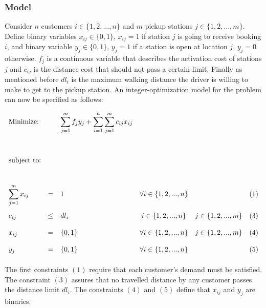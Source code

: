 \documentclass{article}
\begin{document}
\subsubsection{Model}
\label{subsection:model_partI}

Consider $n$ customers $i \in \{1,2,...,n\}$ and $m$ pickup stations $ j \in \{1,2,…,m\}$. Define binary variables $x_{ij} \in \{0, 1\}$,  $x_{ij} = 1$ if station $j$ is going to receive booking $i$, 
and binary variable $y_{j} \in \{0,1\}$, $y_{j}= 1$ if a station is open at location $j$, $y_{j}=0$ otherwise. $f_j$ is a continuous variable that describes the activation cost of stations $j$ and $c_{ij}$ is the distance cost that should not pass a certain limit.
Finally as mentioned before $dl_i$ is the maximum walking distance the driver is willing to make to get to the pickup station.
 An integer-optimization model for the problem can now be specified as follows:


\begin{equation*}
\def\arraystretch{2}
\begin{array}{lllcll} %
\text{Minimize:}  && \displaystyle\sum\limits_{j=1}^{m}f_{j} y_{j} + \sum\limits_{i=1}^{n}\sum\limits_{j=1}^{m}c_{ij}x_{ij} && & \\
	&	&	&	&	&  \\
\text{subject to:}&   &  &  & &\\
	&	&	& 	&	& \\
	 \displaystyle\sum\limits_{j=1}^{m}x_{ij} &=& 1 &  \forall i \in \{1,2,...,n\} & & (1) \\  
	 c_{ij} &\leq& dl_i &  i \in \{1,2,...,n\} &j \in \{1,2,...,m\}  & (3) \\ 
	 x_{ij} &=& \{0,1\} &  \forall  i \in \{1,2,...,n\} &j \in \{1,2,...,m\} & (4) \\ 
	 y_{j} &=& \{0,1\} &  \forall i \in \{1,2,...,n\} & & (5) \\ 
\end{array}
\end{equation*}

The first constraints $(1)$ require that each customer’s demand must be satisfied.%
The constraint $(3)$ assures that no travelled distance by any customer passes the distance limit $dl_i$. The constraints $(4)$ and $(5)$ define that $x_{ij}$ and $y_j$ are binaries.
\end{document}
